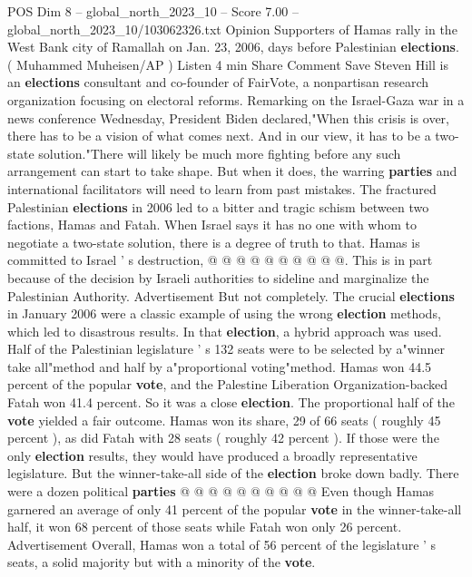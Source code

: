 \begin{textsample}{POS Dim 8 – global\_north\_2023\_10 – Score 7.00 – global\_north\_2023\_10/103062326.txt}  \label{ex:f8_pos_244}
Opinion Supporters of Hamas rally in the West Bank city of Ramallah on Jan. 23, 2006, days before Palestinian \textbf{elections}. ( Muhammed Muheisen/AP ) Listen 4 min Share Comment Save Steven Hill is an \textbf{elections} consultant and co-founder of FairVote, a nonpartisan research organization focusing on electoral reforms.
Remarking on the Israel-Gaza war in a news conference Wednesday, President Biden declared,"When this crisis is over, there has to be a vision of what comes next.
And in our view, it has to be a two-state solution."There will likely be much more fighting before any such arrangement can start to take shape.
But when it does, the warring \textbf{parties} and international facilitators will need to learn from past mistakes.
The fractured Palestinian \textbf{elections} in 2006 led to a bitter and tragic schism between two factions, Hamas and Fatah.
When Israel says it has no one with whom to negotiate a two-state solution, there is a degree of truth to that.
Hamas is committed to Israel ' s destruction, @ @ @ @ @ @ @ @ @ @.
This is in part because of the decision by Israeli authorities to sideline and marginalize the Palestinian Authority.
Advertisement But not completely.
The crucial \textbf{elections} in January 2006 were a classic example of using the wrong \textbf{election} methods, which led to disastrous results.
In that \textbf{election}, a hybrid approach was used.
Half of the Palestinian legislature ' s 132 seats were to be selected by a"winner take all"method and half by a"proportional voting"method.
Hamas won 44.5 percent of the popular \textbf{vote}, and the Palestine Liberation Organization-backed Fatah won 41.4 percent.
So it was a close \textbf{election}.
The proportional half of the \textbf{vote} yielded a fair outcome.
Hamas won its share, 29 of 66 seats ( roughly 45 percent ), as did Fatah with 28 seats ( roughly 42 percent ).
If those were the only \textbf{election} results, they would have produced a broadly representative legislature.
But the winner-take-all side of the \textbf{election} broke down badly.
There were a dozen political \textbf{parties} @ @ @ @ @ @ @ @ @ @ Even though Hamas garnered an average of only 41 percent of the popular \textbf{vote} in the winner-take-all half, it won 68 percent of those seats while Fatah won only 26 percent.
Advertisement Overall, Hamas won a total of 56 percent of the legislature ' s seats, a solid majority but with a minority of the \textbf{vote}.

\end{textsample}
